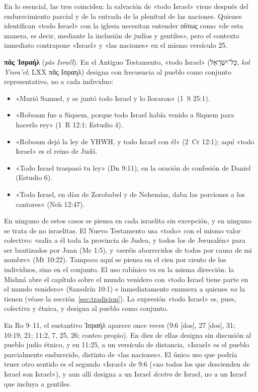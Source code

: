\documentclass[11pt,letterpaper]{article}
\newcommand{\heb}[1]{\mbox{\foreignlanguage{hebrew}{#1}}}
\newcommand{\grc}[1]{\foreignlanguage{ancientgreek}{#1}}
\begin{document}
En lo esencial, las tres coinciden: la salvación de «todo Israel» viene después del endurecimiento parcial y de la entrada de la plenitud de las naciones. Quienes identifican «todo Israel» con la iglesia necesitan entender \grc{οὕτως} como «de esta manera, es decir, mediante la inclusión de judíos y gentiles», pero el contexto inmediato contrapone «Israel» y «las naciones» en el mismo versículo 25.

\textbf{\grc{πᾶς Ἰσραήλ}} (\emph{pâs Israḗl}). En el Antiguo Testamento, «todo Israel» (\heb{כָּל־יִשְׂרָאֵל}, \emph{kol Yisra'el}; LXX \grc{πᾶς Ισραηλ}) designa con frecuencia al pueblo como conjunto representativo, no a cada individuo:
\begin{itemize}
\item «Murió Samuel, y se juntó todo Israel y lo lloraron» (1~S 25:1).
\item «Roboam fue a Siquem, porque todo Israel había venido a Siquem para hacerlo rey» (1~R 12:1; Estudio 4).
\item «Roboam dejó la ley de YHWH, y todo Israel con él» (2~Cr 12:1); aquí «todo Israel» es el reino de Judá.
\item «Todo Israel traspasó tu ley» (Dn 9:11), en la oración de confesión de Daniel (Estudio 6).
\item «Todo Israel, en días de Zorobabel y de Nehemías, daba las porciones a los cantores» (Neh 12:47).
\end{itemize}
En ninguno de estos casos se piensa en cada israelita sin excepción, y en ninguno se trata de no israelitas. El Nuevo Testamento usa «todo» con el mismo valor colectivo: «salía a él toda la provincia de Judea, y todos los de Jerusalén» para ser bautizados por Juan (Mc 1:5), y «seréis aborrecidos de todos por causa de mi nombre» (Mt 10:22). Tampoco aquí se piensa en el cien por ciento de los individuos, sino en el conjunto. El uso rabínico va en la misma dirección: la Mishná abre el capítulo sobre el mundo venidero con «todo Israel tiene parte en el mundo venidero» (Sanedrín 10:1) e inmediatamente enumera a quienes \emph{no} la tienen (véase la sección~\ref{sec:tradicion}). La expresión «todo Israel» es, pues, colectiva y étnica, y designa al pueblo como conjunto.

En Ro 9--11, el sustantivo \grc{Ἰσραήλ} aparece once veces (9:6 [dos], 27 [dos], 31; 10:19, 21; 11:2, 7, 25, 26; conteo propio). En diez de ellas designa sin discusión al pueblo judío étnico, y en 11:25, a un versículo de distancia, «Israel» es el pueblo parcialmente endurecido, distinto de «las naciones». El único uso que podría tener otro sentido es el segundo «Israel» de 9:6 («no todos los que descienden de Israel son Israel»), y aun allí designa a un Israel \emph{dentro} de Israel, no a un Israel que incluya a gentiles.
\end{document}

